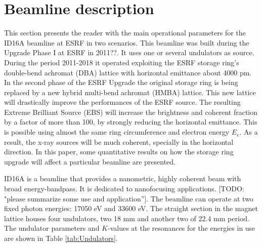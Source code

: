 \documentclass{iucr}              %
\newcommand{\todo}[1]{{\color{red}[TODO: "#1'']}}
\newcommand{\inred}[1]{{\color{red}#1}}
\begin{document}

\section{Beamline description}
\label{Beamline description}

This section presents the reader with the main operational parameters for the ID16A beamline at ESRF in two scenarios. This beamline was built during the Upgrade Phase I at ESRF in \inred{2011??}. It uses one or several undulators as source. During the period 2011-2018 it operated exploiting the ESRF storage ring’s double-bend achromat (DBA) lattice with horizontal emittance about 4000 pm. In the second phase of the ESRF Upgrade the original storage ring is being replaced by a new hybrid multi-bend achromat (HMBA) lattice. This new lattice will drastically improve the performances of the ESRF source. The resulting Extreme Brilliant Source (EBS) \cite{orangebook} will increase the brightness and coherent fraction by a factor of more than 100, by strongly reducing the horizontal emittance. This is possible using almost the same ring circumference and electron energy $E_e$. As a result, the x-ray sources will be much coherent, specially in the horizontal direction. In this paper, some quantitative results on how the storage ring upgrade will affect a particular beamline are presented. 

ID16A \cite{ID16A} is a beamline that provides a nanometric, highly coherent beam with broad energy-bandpass. It is dedicated to nanofocusing applications. \todo{please summarize some use and application}. The beamline can operate at two fixed photon energies: 17050 eV and 33600 eV. The straight section in the magnet lattice houses four undulators, two 18 mm and another two of 22.4 mm period. The undulator parameters and $K$-values at the resonances for the energies in use are shown in Table \ref{tab:Undulators}. 
\end{document}
